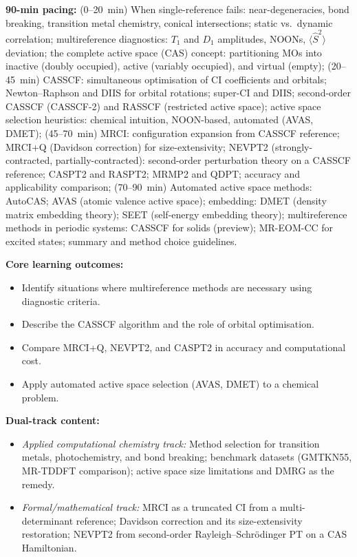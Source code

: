 \documentclass[11pt,a4paper]{article}
\begin{document}
\begin{tcolorbox}[modulebox, title={Module~II.1 / L10: Multi-Reference Methods}]
\textbf{90-min pacing:} (0--20~min) When single-reference fails: near-degeneracies,
bond breaking, transition metal chemistry, conical intersections;
static vs.\ dynamic correlation; multireference diagnostics: $T_1$ and $D_1$ amplitudes,
NOONs, $\langle\hat{S}^2\rangle$ deviation;
the complete active space (CAS) concept: partitioning MOs into inactive (doubly occupied),
active (variably occupied), and virtual (empty);
(20--45~min) CASSCF: simultaneous optimisation of CI coefficients and orbitals;
Newton--Raphson and DIIS for orbital rotations; super-CI and DIIS;
second-order CASSCF (CASSCF-2) and RASSCF (restricted active space);
active space selection heuristics: chemical intuition, NOON-based, automated (AVAS, DMET);
(45--70~min) MRCI: configuration expansion from CASSCF reference; MRCI+Q (Davidson correction)
for size-extensivity; NEVPT2 (strongly-contracted, partially-contracted):
second-order perturbation theory on a CASSCF reference; CASPT2 and RASPT2;
MRMP2 and QDPT; accuracy and applicability comparison;
(70--90~min) Automated active space methods: AutoCAS; AVAS (atomic valence active space);
embedding: DMET (density matrix embedding theory); SEET (self-energy embedding theory);
multireference methods in periodic systems: CASSCF for solids (preview);
MR-EOM-CC for excited states; summary and method choice guidelines.

\medskip\textbf{Core learning outcomes:}
\begin{itemize}[leftmargin=1.4em,topsep=2pt,itemsep=1pt]
  \item Identify situations where multireference methods are necessary using diagnostic criteria.
  \item Describe the CASSCF algorithm and the role of orbital optimisation.
  \item Compare MRCI+Q, NEVPT2, and CASPT2 in accuracy and computational cost.
  \item Apply automated active space selection (AVAS, DMET) to a chemical problem.
\end{itemize}

\medskip\textbf{Dual-track content:}
\begin{itemize}[leftmargin=1.4em,topsep=2pt,itemsep=1pt]
  \item \textit{Applied computational chemistry track:} Method selection for transition metals,
    photochemistry, and bond breaking; benchmark datasets (GMTKN55, MR-TDDFT comparison);
    active space size limitations and DMRG as the remedy.
  \item \textit{Formal/mathematical track:} MRCI as a truncated CI from a multi-determinant
    reference; Davidson correction and its size-extensivity restoration; NEVPT2 from
    second-order Rayleigh--Schr\"odinger PT on a CAS Hamiltonian.
\end{itemize}


\end{tcolorbox}
\end{document}
